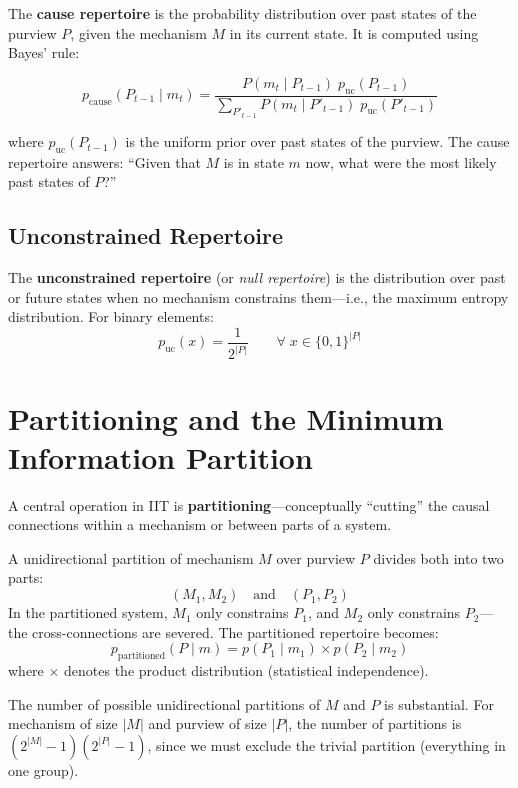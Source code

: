 \documentclass[11pt,a4paper]{report}
\begin{document}
The \textbf{cause repertoire} is the probability distribution over past states of the purview $P$, given the mechanism $M$ in its current state. It is computed using Bayes' rule:

\begin{mathbox}
\vspace{-8pt}
\[
  p_{\text{cause}}(P_{t-1} \mid m_t) = \frac{P(m_t \mid P_{t-1})\; p_{\text{uc}}(P_{t-1})}{\sum_{P'_{t-1}} P(m_t \mid P'_{t-1})\; p_{\text{uc}}(P'_{t-1})}
\]
\vspace{-10pt}
\end{mathbox}

where $p_{\text{uc}}(P_{t-1})$ is the uniform prior over past states of the purview. The cause repertoire answers: ``Given that $M$ is in state $m$ now, what were the most likely past states of $P$?''

\subsection{Unconstrained Repertoire}

The \textbf{unconstrained repertoire} (or \emph{null repertoire}) is the distribution over past or future states when no mechanism constrains them---i.e., the maximum entropy distribution. For binary elements:
\[
  p_{\text{uc}}(x) = \frac{1}{2^{|P|}} \qquad \forall\; x \in \{0,1\}^{|P|}
\]

\section{Partitioning and the Minimum Information Partition}

A central operation in IIT is \textbf{partitioning}---conceptually ``cutting'' the causal connections within a mechanism or between parts of a system.

\begin{definitionbox}
A unidirectional partition of mechanism $M$ over purview $P$ divides both into two parts:
\[
  (M_1, M_2) \quad\text{and}\quad (P_1, P_2)
\]
In the partitioned system, $M_1$ only constrains $P_1$, and $M_2$ only constrains $P_2$---the cross-connections are severed. The partitioned repertoire becomes:
\[
  p_{\text{partitioned}}(P \mid m) = p(P_1 \mid m_1) \times p(P_2 \mid m_2)
\]
where $\times$ denotes the product distribution (statistical independence).
\end{definitionbox}

The number of possible unidirectional partitions of $M$ and $P$ is substantial. For mechanism of size $|M|$ and purview of size $|P|$, the number of partitions is $(2^{|M|} - 1)(2^{|P|} - 1)$, since we must exclude the trivial partition (everything in one group).
\end{document}
